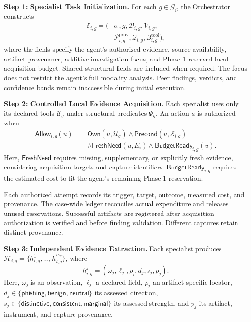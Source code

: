 \medskip
\noindent\textbf{Step 1: Specialist Task
Initialization.}
For each $g\in\mathcal G_i$, the
Orchestrator constructs
\begin{equation}
\begin{aligned}
\mathcal E_{i,g}=\big(
&o_i,g,\mathcal D_{i,g},
\mathcal V_{i,g},\\
&\mathcal P_{i,g}^{\mathrm{prov}},
\mathcal Q_{i,g},
B_{i,g}^{\mathrm{tool}}
\big),
\end{aligned}
\label{eq:specialist-envelope}
\end{equation}
where the fields specify the agent's
authorized evidence, source availability,
artifact provenance, additive investigation
focus, and Phase-1-reserved local
acquisition budget. Shared structural
fields are included when required.
The focus does not restrict the agent's
full modality analysis. Peer findings,
verdicts, and confidence bands remain
inaccessible during initial execution.

\medskip
\noindent\textbf{Step 2: Controlled Local
Evidence Acquisition.}
Each specialist uses only its declared
tools $\mathcal U_g$ under structural
predicates $\Psi_g$. An action $u$
is authorized when
\begin{equation}
\begin{aligned}
\mathsf{Allow}_{i,g}(u)={}&
\mathsf{Own}(u,\mathcal U_g)
\land\mathsf{Precond}(u,\mathcal E_{i,g})\\
&\land\mathsf{FreshNeed}(u,E_i)
\land\mathsf{BudgetReady}_{i,g}(u).
\end{aligned}
\label{eq:local-tool-authorization}
\end{equation}
Here, $\mathsf{FreshNeed}$ requires
missing, supplementary, or explicitly
fresh evidence, considering acquisition
targets and capture identifiers.
$\mathsf{BudgetReady}_{i,g}$ requires
the estimated cost to fit the agent's
remaining Phase-1 reservation.

Each authorized attempt records its
trigger, target, outcome, measured
cost, and provenance. The case-wide
ledger reconciles actual expenditure
and releases unused reservations.
Successful artifacts are registered
after acquisition authorization is
verified and before finding validation.
Different captures retain distinct
provenance.

\medskip
\noindent\textbf{Step 3: Independent
Evidence Extraction.}
Each specialist produces
$\mathcal H_{i,g}
=\{h_{i,g}^{1},\ldots,h_{i,g}^{m_g}\}$,
where
\begin{equation}
h_{i,g}^{j}=
(\omega_j,\ell_j,\rho_j,d_j,s_j,p_j).
\label{eq:evidence-item}
\end{equation}
Here, $\omega_j$ is an observation,
$\ell_j$ a declared field,
$\rho_j$ an artifact-specific locator,
$d_j\in\{\mathsf{phishing},
\mathsf{benign},\mathsf{neutral}\}$
its assessed direction,
$s_j\in\{\mathsf{distinctive},
\mathsf{consistent},\mathsf{marginal}\}$
its assessed strength, and $p_j$
its artifact, instrument, and capture
provenance.

